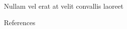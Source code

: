 \documentclass[final]{beamer}
\newlength{\sepwidth}
\newlength{\colwidth}
\newcommand{\separatorcolumn}{\begin{column}{\sepwidth}\end{column}}
\begin{document}
\begin{frame}[t]
\begin{columns}[t]
\begin{column}{\colwidth}
\begin{block}{Nullam vel erat at velit convallis laoreet}
  \end{block}

  \begin{block}{References}

    \nocite{*}
    \footnotesize{}

  \end{block}

\end{column}

\separatorcolumn
\end{columns}
\end{frame}
\end{document}
